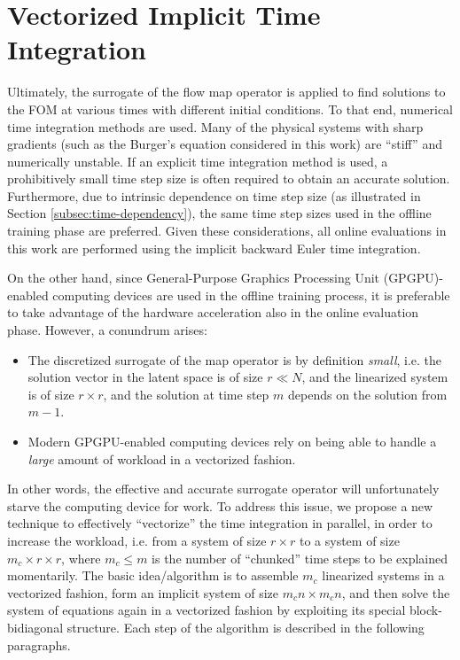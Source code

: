 \section{Vectorized Implicit Time Integration}

Ultimately, the surrogate of the flow map operator is applied to find solutions to the FOM at various times with different initial conditions. To that end, numerical time integration methods are used. Many of the physical systems with sharp gradients (such as the Burger's equation considered in this work) are ``stiff'' and numerically unstable. If an explicit time integration method is used, a prohibitively small time step size is often required to obtain an accurate solution. Furthermore, due to intrinsic dependence on time step size (as illustrated in Section \ref{subsec:time-dependency}), the same time step sizes used in the offline training phase are preferred. Given these considerations, all online evaluations in this work are performed using the implicit backward Euler time integration.

On the other hand, since General-Purpose Graphics Processing Unit (GPGPU)-enabled computing devices are used in the offline training process, it is preferable to take advantage of the hardware acceleration also in the online evaluation phase. However, a conundrum arises: 
\begin{itemize}
    \item The discretized surrogate of the map operator is by definition \emph{small}, i.e. the solution vector in the latent space is of size $r \ll N$, and the linearized system is of size $r \times r$, and the solution at time step $m$ depends on the solution from $m-1$.
    \item Modern GPGPU-enabled computing devices rely on being able to handle a \emph{large} amount of workload in a vectorized fashion. 
\end{itemize}
In other words, the effective and accurate surrogate operator will unfortunately starve the computing device for work. To address this issue, we propose a new technique to effectively ``vectorize'' the time integration in parallel, in order to increase the workload, i.e. from a system of size $r \times r$ to a system of size $m_c \times r \times r$, where $m_c \leq m$ is the number of ``chunked'' time steps to be explained momentarily. The basic idea/algorithm is to assemble $m_c$ linearized systems in a vectorized fashion, form an implicit system of size $m_c n \times m_c n$, and then solve the system of equations again in a vectorized fashion by exploiting its special block-bidiagonal structure. Each step of the algorithm is described in the following paragraphs.

